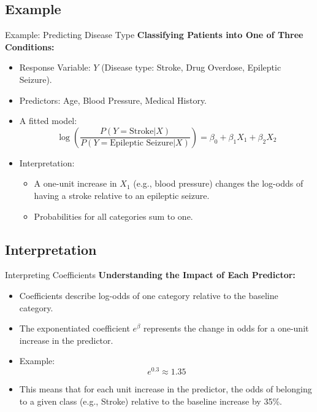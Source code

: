 \documentclass[aspectratio=169,xcolor=dvipsnames]{beamer}
\begin{document}
\subsection{Example}
\begin{frame}{Example: Predicting Disease Type}
    \textbf{Classifying Patients into One of Three Conditions:}
    \begin{itemize}
        \item Response Variable: \( Y \) (Disease type: Stroke, Drug Overdose, Epileptic Seizure).
        \item Predictors: Age, Blood Pressure, Medical History.
        \item A fitted model:
        \begin{equation}
            \log \left( \frac{P(Y = \text{Stroke} | X)}{P(Y = \text{Epileptic Seizure} | X)} \right) = \beta_0 + \beta_1 X_1 + \beta_2 X_2
        \end{equation}
        \item Interpretation:
        \begin{itemize}
            \item A one-unit increase in \( X_1 \) (e.g., blood pressure) changes the log-odds of having a stroke relative to an epileptic seizure.
            \item Probabilities for all categories sum to one.
        \end{itemize}
    \end{itemize}
\end{frame}

\subsection{Interpretation}
\begin{frame}{Interpreting Coefficients}
    \textbf{Understanding the Impact of Each Predictor:}
    \begin{itemize}
        \item Coefficients describe log-odds of one category relative to the baseline category.
        \item The exponentiated coefficient \( e^{\beta} \) represents the change in odds for a one-unit increase in the predictor.
        \item Example:
        \begin{equation}
            e^{0.3} \approx 1.35
        \end{equation}
        \item This means that for each unit increase in the predictor, the odds of belonging to a given class (e.g., Stroke) relative to the baseline increase by 35\%.
    \end{itemize}
\end{frame}
\end{document}
